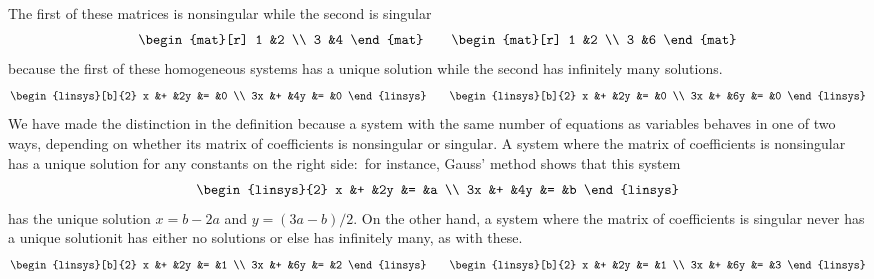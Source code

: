 \begin{example}
The first of these matrices is nonsingular while the second is singular
\begin{equation*}
  \begin{mat}[r]
    1  &2  \\
    3  &4
  \end{mat}
  \qquad
  \begin{mat}[r]
    1  &2  \\
    3  &6
  \end{mat}
\end{equation*}
because the first of these homogeneous systems has a unique solution 
while the second has infinitely many solutions.
\begin{equation*}
  \begin{linsys}[b]{2}
    x &+  &2y  &=  &0  \\
   3x &+  &4y  &=  &0  
  \end{linsys}
  \qquad
  \begin{linsys}[b]{2}
    x &+  &2y  &=  &0  \\
   3x &+  &6y  &=  &0
  \end{linsys}
\end{equation*}  
We have made the distinction in the definition because a system
with the same number of equations as variables
behaves in one of two ways, depending on whether its matrix of coefficients
is nonsingular or singular.
A system where the matrix of coefficients is nonsingular 
has a unique solution for any constants on the right 
side:~for instance, Gauss' method shows that this system
\begin{equation*}
  \begin{linsys}{2}
    x  &+  &2y  &=  &a \\
    3x &+  &4y  &=  &b
  \end{linsys}
\end{equation*}
has the unique solution $x=b-2a$ and  $y=(3a-b)/2$.
On the other hand, a system where the matrix of coefficients is
singular never has a unique solution\Dash it 
has either no solutions or else has infinitely many, as with these.
\begin{equation*}
  \begin{linsys}[b]{2}
    x  &+  &2y  &=   &1   \\
   3x  &+  &6y  &=   &2   
  \end{linsys}
  \qquad
  \begin{linsys}[b]{2}
    x  &+  &2y  &=   &1   \\
   3x  &+  &6y  &=   &3
  \end{linsys}
\end{equation*} 
\end{example}

